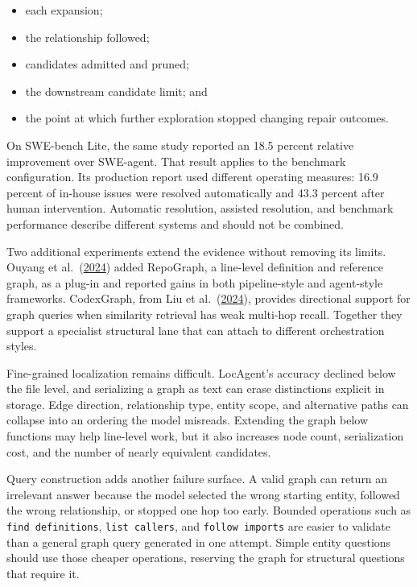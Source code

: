 \begin{itemize}
\tightlist
\item
  each expansion;
\item
  the relationship followed;
\item
  candidates admitted and pruned;
\item
  the downstream candidate limit; and
\item
  the point at which further exploration stopped changing repair outcomes.
\end{itemize}

On SWE-bench Lite, the same study reported an 18.5 percent relative improvement over SWE-agent. That result applies to the benchmark configuration. Its production report used different operating measures: 16.9 percent of in-house issues were resolved automatically and 43.3 percent after human intervention. Automatic resolution, assisted resolution, and benchmark performance describe different systems and should not be combined.

Two additional experiments extend the evidence without removing its limits. Ouyang et al.~(\href{https://arxiv.org/abs/2410.14684}{2024}) added RepoGraph, a line-level definition and reference graph, as a plug-in and reported gains in both pipeline-style and agent-style frameworks. CodexGraph, from Liu et al.~(\href{https://arxiv.org/abs/2408.03910}{2024}), provides directional support for graph queries when similarity retrieval has weak multi-hop recall. Together they support a specialist structural lane that can attach to different orchestration styles.

Fine-grained localization remains difficult. LocAgent's accuracy declined below the file level, and serializing a graph as text can erase distinctions explicit in storage. Edge direction, relationship type, entity scope, and alternative paths can collapse into an ordering the model misreads. Extending the graph below functions may help line-level work, but it also increases node count, serialization cost, and the number of nearly equivalent candidates.

Query construction adds another failure surface. A valid graph can return an irrelevant answer because the model selected the wrong starting entity, followed the wrong relationship, or stopped one hop too early. Bounded operations such as \texttt{find\ definitions}, \texttt{list\ callers}, and \texttt{follow\ imports} are easier to validate than a general graph query generated in one attempt. Simple entity questions should use those cheaper operations, reserving the graph for structural questions that require it.

